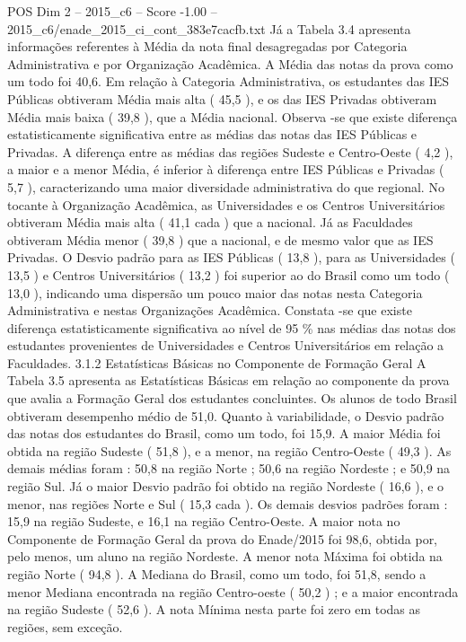 \begin{textsample}{POS Dim 2 – 2015\_c6 – Score -1.00 – 2015\_c6/enade\_2015\_ci\_cont\_383e7cacfb.txt}
Já a Tabela 3.4 apresenta informações referentes à Média da nota final desagregadas por Categoria Administrativa e por Organização Acadêmica.
A Média das notas da prova como um todo foi 40,6.
Em relação à Categoria Administrativa, os estudantes das IES Públicas obtiveram Média mais alta ( 45,5 ), e os das IES Privadas obtiveram Média mais baixa ( 39,8 ), que a Média nacional.
Observa -se que existe diferença estatisticamente significativa entre as médias das notas das IES Públicas e Privadas.
A diferença entre as médias das regiões Sudeste e Centro-Oeste ( 4,2 ), a maior e a menor Média, é inferior à diferença entre IES Públicas e Privadas ( 5,7 ), caracterizando uma maior diversidade administrativa do que regional.
No tocante à Organização Acadêmica, as Universidades e os Centros Universitários obtiveram Média mais alta ( 41,1 cada ) que a nacional.
Já as Faculdades obtiveram Média menor ( 39,8 ) que a nacional, e de mesmo valor que as IES Privadas.
O Desvio padrão para as IES Públicas ( 13,8 ), para as Universidades ( 13,5 ) e Centros Universitários ( 13,2 ) foi superior ao do Brasil como um todo ( 13,0 ), indicando uma dispersão um pouco maior das notas nesta Categoria Administrativa e nestas Organizações Acadêmica.
Constata -se que existe diferença estatisticamente significativa ao nível de 95 \% nas médias das notas dos estudantes provenientes de Universidades e Centros Universitários em relação a Faculdades. 3.1.2 Estatísticas Básicas no Componente de Formação Geral A Tabela 3.5 apresenta as Estatísticas Básicas em relação ao componente da prova que avalia a Formação Geral dos estudantes concluintes.
Os alunos de todo Brasil obtiveram desempenho médio de 51,0.
Quanto à variabilidade, o Desvio padrão das notas dos estudantes do Brasil, como um todo, foi 15,9.
A maior Média foi obtida na região Sudeste ( 51,8 ), e a menor, na região Centro-Oeste ( 49,3 ).
As demais médias foram : 50,8 na região Norte ; 50,6 na região Nordeste ; e 50,9 na região Sul.
Já o maior Desvio padrão foi obtido na região Nordeste ( 16,6 ), e o menor, nas regiões Norte e Sul ( 15,3 cada ).
Os demais desvios padrões foram : 15,9 na região Sudeste, e 16,1 na região Centro-Oeste.
A maior nota no Componente de Formação Geral da prova do Enade/2015 foi 98,6, obtida por, pelo menos, um aluno na região Nordeste.
A menor nota Máxima foi obtida na região Norte ( 94,8 ).
A Mediana do Brasil, como um todo, foi 51,8, sendo a menor Mediana encontrada na região Centro-oeste ( 50,2 ) ; e a maior encontrada na região Sudeste ( 52,6 ).
A nota Mínima nesta parte foi zero em todas as regiões, sem exceção.

\end{textsample}
